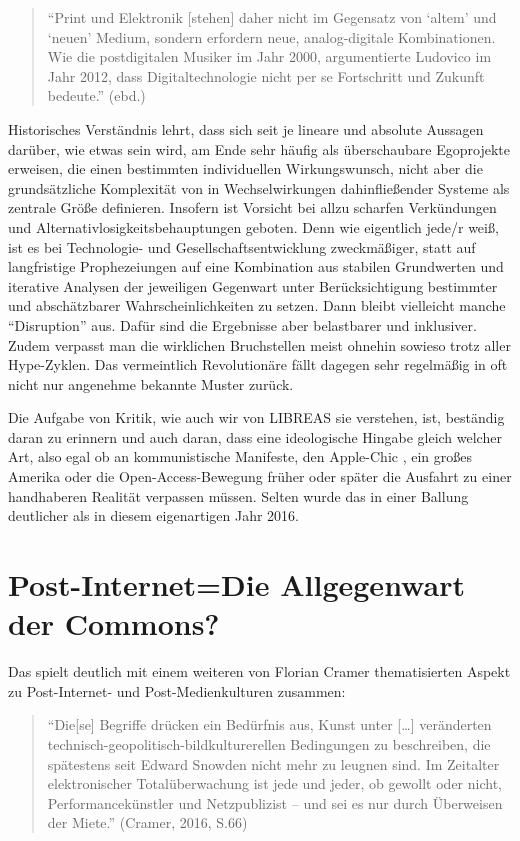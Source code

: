 \documentclass[a4paper,
fontsize=11pt,
oneside,
numbers=noperiodatend,
parskip=half-,
bibliography=totoc,
final
]{scrartcl}
\begin{document}
\begin{quote}
\enquote{Print und Elektronik {[}stehen{]} daher nicht im Gegensatz von
\enquote{altem} und \enquote{neuen} Medium, sondern erfordern neue,
analog-digitale Kombinationen. Wie die postdigitalen Musiker im Jahr
2000, argumentierte Ludovico im Jahr 2012, dass Digitaltechnologie nicht
per se Fortschritt und Zukunft bedeute.} (ebd.)
\end{quote}

Historisches Verständnis lehrt, dass sich seit je lineare und absolute
Aussagen darüber, wie etwas sein wird, am Ende sehr häufig als
überschaubare Egoprojekte erweisen, die einen bestimmten individuellen
Wirkungswunsch, nicht aber die grundsätzliche Komplexität von in
Wechselwirkungen dahinfließender Systeme als zentrale Größe definieren.
Insofern ist Vorsicht bei allzu scharfen Verkündungen und
Alternativlosigkeitsbehauptungen geboten. Denn wie eigentlich jede/r
weiß, ist es bei Technologie- und Gesellschaftsentwicklung zweckmäßiger,
statt auf langfristige Prophezeiungen auf eine Kombination aus stabilen
Grundwerten und iterative Analysen der jeweiligen Gegenwart unter
Berücksichtigung bestimmter und abschätzbarer Wahrscheinlichkeiten zu
setzen. Dann bleibt vielleicht manche \enquote{Disruption} aus. Dafür
sind die Ergebnisse aber belastbarer und inklusiver. Zudem verpasst man
die wirklichen Bruchstellen meist ohnehin sowieso trotz aller
Hype-Zyklen. Das vermeintlich Revolutionäre fällt dagegen sehr
regelmäßig in oft nicht nur angenehme bekannte Muster zurück.

Die Aufgabe von Kritik, wie auch wir von LIBREAS sie verstehen, ist,
beständig daran zu erinnern und auch daran, dass eine ideologische
Hingabe gleich welcher Art, also egal ob an kommunistische Manifeste,
den Apple-Chic , ein großes Amerika oder die Open-Access-Bewegung früher
oder später die Ausfahrt zu einer handhaberen Realität verpassen müssen.
Selten wurde das in einer Ballung deutlicher als in diesem eigenartigen
Jahr 2016.

\section*{Post-Internet=Die Allgegenwart der
Commons?}\label{post-internetdie-allgegenwart-der-commons}

Das spielt deutlich mit einem weiteren von Florian Cramer thematisierten
Aspekt zu Post-Internet- und Post-Medienkulturen zusammen:

\begin{quote}
\enquote{Die{[}se{]} Begriffe drücken ein Bedürfnis aus, Kunst unter
{[}\ldots{}{]} veränderten technisch-geopolitisch-bildkulturerellen
Bedingungen zu beschreiben, die spätestens seit Edward Snowden nicht
mehr zu leugnen sind. Im Zeitalter elektronischer Totalüberwachung ist
jede und jeder, ob gewollt oder nicht, Performancekünstler und
Netzpublizist -- und sei es nur durch Überweisen der Miete.} (Cramer,
2016, S.66)
\end{quote}
\end{document}
